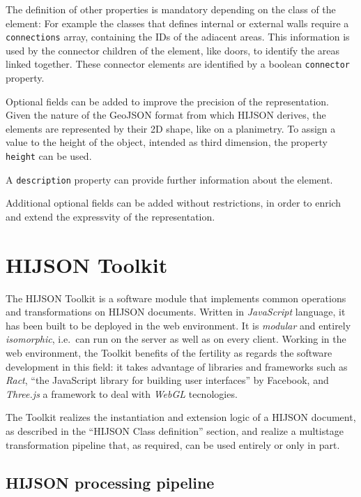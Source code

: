 \documentclass{sig-alternate}
\begin{document}
The definition of other properties is mandatory depending on the class
of the element: For example the classes that defines internal or
external walls require a \texttt{connections} array, containing the IDs
of the adiacent areas. This information is used by the connector
children of the element, like doors, to identify the areas linked
together. These connector elements are identified by a
boolean \texttt{connector} property.

Optional fields can be added to improve the precision of the
representation. Given the nature of the GeoJSON format from which HIJSON
derives, the elements are represented by their 2D shape, like on a
planimetry. To assign a value to the height of the object, intended as
third dimension, the property \texttt{height} can be used.

A \texttt{description} property can provide further information about
the element.

Additional optional fields can be added without restrictions, in order to enrich and extend the
expressvity of the representation.

\section{HIJSON Toolkit}\label{hijson-toolkit}

The HIJSON Toolkit is a software module that implements common
operations and transformations on HIJSON documents. Written in
\emph{JavaScript} language, it has been built to be deployed in the web
environment. It is \emph{modular} and entirely \emph{isomorphic},
i.e.~can run on the server as well as on every client. Working in the
web environment, the Toolkit benefits of the fertility as regards the
software development in this field: it takes advantage of libraries and
frameworks such as \emph{Ract}, ``the JavaScript library for building
user interfaces'' by Facebook, and \emph{Three.js} a framework to deal
with \emph{WebGL} tecnologies.

The Toolkit realizes the instantiation and extension logic of a HIJSON
document, as described in the ``HIJSON Class definition'' section, and
realize a multistage transformation pipeline that, as required, can be
used entirely or only in part.

\subsection{HIJSON processing pipeline}\label{hijson-processing-pipeline}
\end{document}
